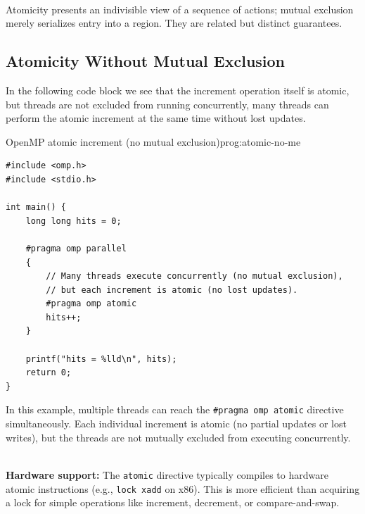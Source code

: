 \begin{ppkey}
\\ Atomicity presents an indivisible view of a sequence of actions; mutual exclusion merely serializes entry into a region. They are related but distinct guarantees.
\end{ppkey}

\subsection{Atomicity Without Mutual Exclusion}

\begin{ppexample}
 In the following code block we see that the increment operation itself is atomic, but threads are not excluded from running concurrently, many threads can perform the atomic increment at the same time without lost updates.
\end{ppexample}

\begin{ppprogram}{OpenMP atomic increment (no mutual exclusion)}{prog:atomic-no-me}
\begin{lstlisting}[language=OpenMP]
#include <omp.h>
#include <stdio.h>

int main() {
    long long hits = 0;

    #pragma omp parallel
    {
        // Many threads execute concurrently (no mutual exclusion),
        // but each increment is atomic (no lost updates).
        #pragma omp atomic
        hits++;
    }

    printf("hits = %lld\n", hits);
    return 0;
}
\end{lstlisting}
\end{ppprogram}

In this example, multiple threads can reach the \texttt{\#pragma omp atomic} directive simultaneously. Each individual increment is atomic (no partial updates or lost writes), but the threads are not mutually excluded from executing concurrently.

\begin{ppnote}
\textbf{\\ Hardware support:} The \texttt{atomic} directive typically compiles to hardware atomic instructions (e.g., \texttt{lock xadd} on x86). This is more efficient than acquiring a lock for simple operations like increment, decrement, or compare-and-swap.
\end{ppnote}

